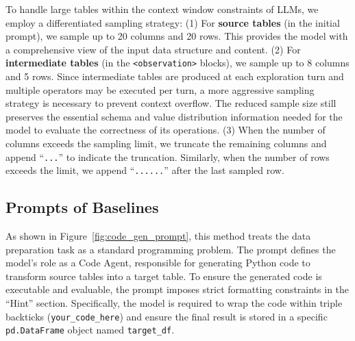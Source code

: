 To handle large tables within the context window constraints of LLMs, we employ a differentiated sampling strategy:
(1) For \textbf{source tables} (in the initial prompt), we sample up to 20 columns and 20 rows. This provides the model with a comprehensive view of the input data structure and content.
(2) For \textbf{intermediate tables} (in the \texttt{<observation>} blocks), we sample up to 8 columns and 5 rows. Since intermediate tables are produced at each exploration turn and multiple operators may be executed per turn, a more aggressive sampling strategy is necessary to prevent context overflow. The reduced sample size still preserves the essential schema and value distribution information needed for the model to evaluate the correctness of its operations.
(3) When the number of columns exceeds the sampling limit, we truncate the remaining columns and append ``\texttt{...}'' to indicate the truncation. Similarly, when the number of rows exceeds the limit, we append ``\texttt{......}'' after the last sampled row.


\subsection{Prompts of Baselines}
\label{subsec:prompts_of_baselines}











As shown in Figure~\ref{fig:code_gen_prompt}, this method treats the data preparation task as a standard programming problem.
The prompt defines the model's role as a Code Agent, responsible for generating Python code to transform source tables into a target table. To ensure the generated code is executable and evaluable, the prompt imposes strict formatting constraints in the ``Hint'' section. Specifically, the model is required to wrap the code within triple backticks (\texttt{your\_code\_here}) and ensure the final result is stored in a specific \texttt{pd.DataFrame} object named \texttt{target\_df}.


